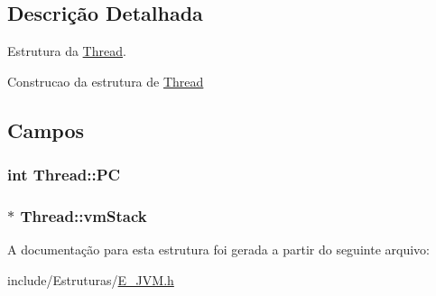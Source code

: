 \subsection{Descrição Detalhada}
Estrutura da \hyperlink{struct_thread}{Thread}. 

Construcao da estrutura de \hyperlink{struct_thread}{Thread} 

\subsection{Campos}
\hypertarget{struct_thread_acbbbde7dd2d37d9536513e2cdbae37f6}{}
\subsubsection[{P\+C}]{\setlength{\rightskip}{0pt plus 5cm}int Thread\+::\+P\+C}\label{struct_thread_acbbbde7dd2d37d9536513e2cdbae37f6}
\hypertarget{struct_thread_a14942cb194dc5185288e629c6da5ac3a}{}
\subsubsection[{vm\+Stack}]{$\ast$ Thread\+::vm\+Stack}\label{struct_thread_a14942cb194dc5185288e629c6da5ac3a}


A documentação para esta estrutura foi gerada a partir do seguinte arquivo\+:\begin{DoxyCompactItemize}
\item 
include/\+Estruturas/\hyperlink{_e___j_v_m_8h}{E\+\_\+\+J\+V\+M.\+h}\end{DoxyCompactItemize}
